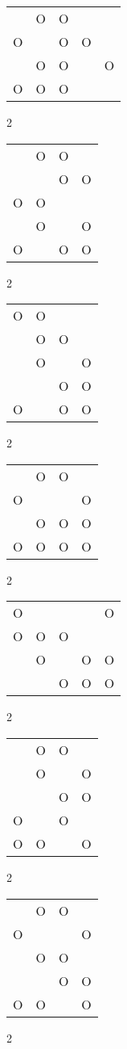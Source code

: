 \begin{tabular}{|m{0.2cm}m{0.2cm}m{0.2cm}m{0.2cm}m{0.2cm}|}\hline
 &O&O& & \\
O& &O&O& \\
 &O&O& &O\\
O&O&O& & \\
\hline\end{tabular}2
\begin{tabular}{|m{0.2cm}m{0.2cm}m{0.2cm}m{0.2cm}|}\hline
 &O&O& \\
 & &O&O\\
O&O& & \\
 &O& &O\\
O& &O&O\\
\hline\end{tabular}2
\begin{tabular}{|m{0.2cm}m{0.2cm}m{0.2cm}m{0.2cm}|}\hline
O&O& & \\
 &O&O& \\
 &O& &O\\
 & &O&O\\
O& &O&O\\
\hline\end{tabular}2
\begin{tabular}{|m{0.2cm}m{0.2cm}m{0.2cm}m{0.2cm}|}\hline
 &O&O& \\
O& & &O\\
 &O&O&O\\
O&O&O&O\\
\hline\end{tabular}2
\begin{tabular}{|m{0.2cm}m{0.2cm}m{0.2cm}m{0.2cm}m{0.2cm}|}\hline
O& & & &O\\
O&O&O& & \\
 &O& &O&O\\
 & &O&O&O\\
\hline\end{tabular}2
\begin{tabular}{|m{0.2cm}m{0.2cm}m{0.2cm}m{0.2cm}|}\hline
 &O&O& \\
 &O& &O\\
 & &O&O\\
O& &O& \\
O&O& &O\\
\hline\end{tabular}2
\begin{tabular}{|m{0.2cm}m{0.2cm}m{0.2cm}m{0.2cm}|}\hline
 &O&O& \\
O& & &O\\
 &O&O& \\
 & &O&O\\
O&O& &O\\
\hline\end{tabular}2

